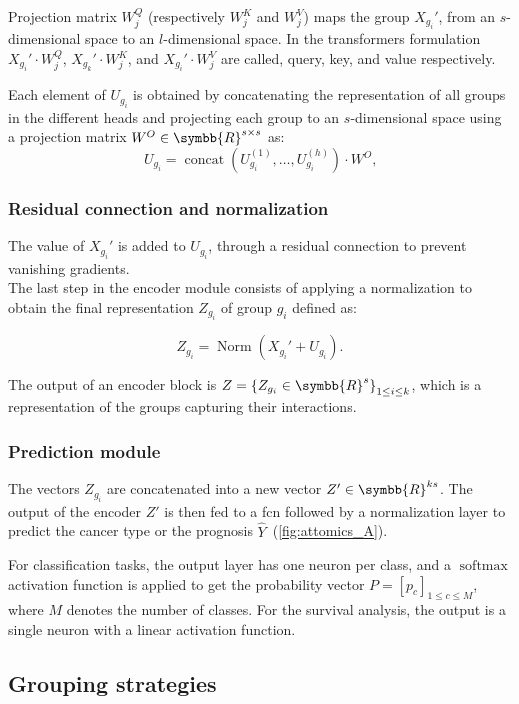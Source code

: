 \documentclass[../main.tex]{subfiles}
\begin{document}
	        Projection matrix \(W^Q_j\) (respectively \(W^K_j\) and \(W^V_j\)) maps the group \(X_{g_i}'\), from an \(s\)-dimensional space to an \(l\)-dimensional space.
	        In the transformers formulation \(X_{g_i}' \cdot W_j^Q\), \(X_{g_k}' \cdot W^K_j\), and \(X_{g_i}' \cdot W^V_j\) are called, query, key, and value respectively.

	        Each element of \(U_{g_i}\) is obtained by concatenating the representation of all groups in the different heads and projecting each group to an \(s\)-dimensional space using a projection matrix \(W^O \in \symbb{R}^{s\times s}\) as:
	        \[ U_{g_i} = \operatorname{concat}\left( U^{(1)}_{g_i}, \ldots, U^{(h)}_{g_i} \right) \cdot W^O \text{,}\]
	    \subsubsection{Residual connection and normalization}
	        The value of \(X_{g_i}'\) is added to \(U_{g_i}\), through a residual connection to prevent vanishing gradients.\\
	        The last step in the encoder module consists of applying a normalization to obtain the final representation \(Z_{g_i}\) of group \(g_i\) defined as:

	        \[Z_{g_i} = \operatorname{Norm}\left(X_{g_i}' + U_{g_i} \right) \text{.}\]

	        The output of an encoder block is \(Z = {\left\{ Z_{g_i} \in \symbb{R}^{s}\right\}}_{1 \leq i \leq k}\), which is a representation of the groups capturing their interactions.

	    \subsubsection{Prediction module}
	        The vectors \(Z_{g_i}\) are concatenated into a new vector \(Z' \in \symbb{R}^{ks}\).
	        The output of the encoder \(Z'\) is then fed to a \gls{fcn} followed by a normalization layer to predict the cancer type or the prognosis \(\hat{Y}\)~(\cref{fig:attomics_A}).

	        For classification tasks,  the output layer has one neuron per class, and a \(\operatorname{softmax}\) activation function is applied to get the probability vector \(P = {\left[p_c\right]}_{1\leq c\leq M}\), where \(M\) denotes the number of classes.
	        For the survival analysis, the output is a single neuron with a linear activation function.

	\subsection{Grouping strategies}\label{sec:grouping}
\end{document}
